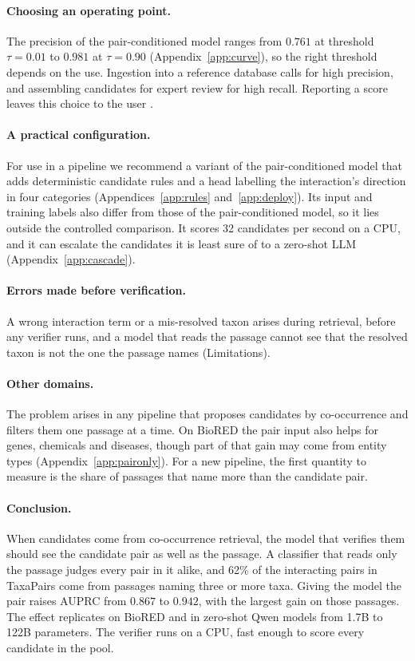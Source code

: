 \documentclass[11pt]{article}
\newcommand{\bench}{\mbox{TaxaPairs}}
\begin{document}
\paragraph{Choosing an operating point.}\label{sec:opoint}
The precision of the pair-conditioned model ranges from $0.761$ at threshold $\tau = 0.01$ to $0.981$ at $\tau = 0.90$ (Appendix~\ref{app:curve}), so the right threshold depends on the use. Ingestion into a reference database calls for high precision, and assembling candidates for expert review for high recall. Reporting a score leaves this choice to the user \citep{geifman2017selective}.

\paragraph{A practical configuration.}\label{sec:deploy}
For use in a pipeline we recommend a variant of the pair-conditioned model that adds deterministic
candidate rules and a head labelling the interaction's direction in four categories
(Appendices~\ref{app:rules} and~\ref{app:deploy}). Its input and training labels also differ from
those of the pair-conditioned model, so it lies outside the controlled comparison. It scores 32
candidates per second on a CPU, and it can escalate the candidates it is least sure of to a
zero-shot LLM (Appendix~\ref{app:cascade}).

\paragraph{Errors made before verification.}
A wrong interaction term or a mis-resolved taxon arises during retrieval, before any verifier runs, and a model that reads the passage cannot see that the resolved taxon is not the one the passage names
(Limitations).

\paragraph{Other domains.}
The problem arises in any pipeline that proposes candidates by co-occurrence and filters them one
passage at a time. On BioRED the pair input also helps for genes, chemicals and diseases, though part
of that gain may come from entity types (Appendix~\ref{app:paironly}). For a new pipeline, the first
quantity to measure is the share of passages that name more than the candidate pair.

\paragraph{Conclusion.}
When candidates come from co-occurrence retrieval, the model that verifies them should see the
candidate pair as well as the passage. A classifier that reads only the passage judges every pair in
it alike, and 62\% of the interacting pairs in \bench{} come from passages naming
three or more taxa. Giving the model the pair raises AUPRC from $0.867$ to $0.942$, with the largest
gain on those passages. The effect replicates on BioRED and in zero-shot Qwen models from 1.7B to
122B parameters. The verifier runs on a CPU, fast enough to score every candidate in the pool.
\end{document}
